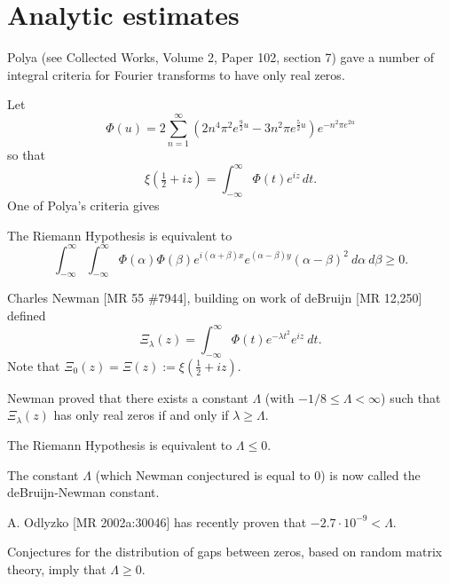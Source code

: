 \documentclass[12pt,letterpaper, reqno]{aimpl}
\begin{document}
\section{Analytic estimates}

\begin{problemblock}
Polya (see Collected Works, Volume 2, Paper 102, section 7) gave a number of
integral criteria for Fourier transforms to have only real zeros.

Let
$$\Phi(u)=2\sum_{n=1}^\infty (2 n^4\pi^2e^{\frac 9 2 u}-3 n^2 \pi e^{\frac 5 2 u})e^{-n^2 \pi e^{2 u}}$$
so that
$$\xi(\tfrac12+i z)=\int_{-\infty}^\infty \Phi(t)e^{iz} \,dt.
$$
One of Polya's criteria gives

\begin{rhequivalence}[9.1] The Riemann Hypothesis is equivalent to
$$
\int_{-\infty}^\infty\int_{-\infty}^\infty
\Phi(\alpha)\Phi(\beta) e^{i(\alpha+\beta)x }
e^{(\alpha-\beta)y}(\alpha-\beta)^2~d\alpha ~d\beta \ge 0.
$$
\end{rhequivalence}
\end{problemblock}

\begin{problemblock}
Charles Newman [MR 55 \#7944],
building on work of deBruijn [MR 12,250]
defined
$$
\Xi_\lambda(z)=\int_{-\infty}^\infty \Phi(t)e^{-\lambda t^2}e^{iz} ~dt.
$$
Note that $\Xi_0(z)=\Xi(z):=\xi(\frac12 + i z)$.

Newman proved that there exists a constant $\Lambda$ (with $-1/8 \le
\Lambda < \infty$) such that $\Xi_\lambda(z)$ has only real zeros if
and only if $\lambda\ge \Lambda$.

\begin{rhequivalence}[9.2] The Riemann Hypothesis is equivalent to
$\Lambda\le 0$.
\end{rhequivalence}

The constant $\Lambda$ (which Newman conjectured is equal to 0) is now called the deBruijn-Newman constant.

\begin{remark}
A. Odlyzko [MR 2002a:30046] has recently proven that
$-2.7·10^{-9}<\Lambda$.
\end{remark}

\begin{remark}
Conjectures for the distribution of gaps between zeros,
based on random matrix theory, imply that $\Lambda \ge 0$.
\end{remark}

\end{problemblock}
\end{document}

